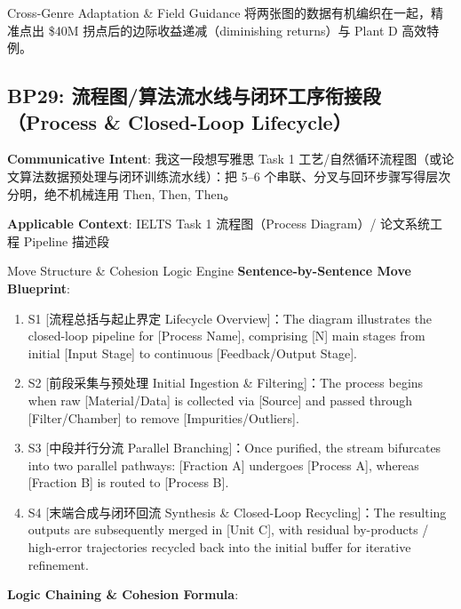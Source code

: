 \endgroup
\vspace{4pt}
\begin{TipBox}{Cross-Genre Adaptation \& Field Guidance}
将两张图的数据有机编织在一起，精准点出 \$40M 拐点后的边际收益递减（diminishing returns）与 Plant D 高效特例。
\end{TipBox}
\vspace{8pt}
\subsection{BP29: 流程图/算法流水线与闭环工序衔接段（Process \& Closed-Loop Lifecycle）}\label{sec:bp:BP29}
\noindent\textbf{\color{AcadNavy}Communicative Intent}: 我这一段想写雅思 Task 1 工艺/自然循环流程图（或论文算法数据预处理与闭环训练流水线）：把 5--6 个串联、分叉与回环步骤写得层次分明，绝不机械连用 Then, Then, Then。\par\vspace{2pt}
\noindent\textbf{\color{AcadSlate}Applicable Context}: IELTS Task 1 流程图（Process Diagram）/ 论文系统工程 Pipeline 描述段\par\vspace{4pt}
\begin{ConceptBox}{Move Structure \& Cohesion Logic Engine}
\textbf{Sentence-by-Sentence Move Blueprint}:
\begin{enumerate}[label=\textbf{\color{AcadNavy}S\arabic*.}, leftmargin=2em, itemsep=2pt]
  \item S1 [流程总括与起止界定 Lifecycle Overview]：The diagram illustrates the closed-loop pipeline for [Process Name], comprising [N] main stages from initial [Input Stage] to continuous [Feedback/Output Stage].
  \item S2 [前段采集与预处理 Initial Ingestion \& Filtering]：The process begins when raw [Material/Data] is collected via [Source] and passed through [Filter/Chamber] to remove [Impurities/Outliers].
  \item S3 [中段并行分流 Parallel Branching]：Once purified, the stream bifurcates into two parallel pathways: [Fraction A] undergoes [Process A], whereas [Fraction B] is routed to [Process B].
  \item S4 [末端合成与闭环回流 Synthesis \& Closed-Loop Recycling]：The resulting outputs are subsequently merged in [Unit C], with residual by-products / high-error trajectories recycled back into the initial buffer for iterative refinement.
\end{enumerate}\par\vspace{4pt}
\textbf{Logic Chaining \& Cohesion Formula}:\par{}
\end{ConceptBox}
